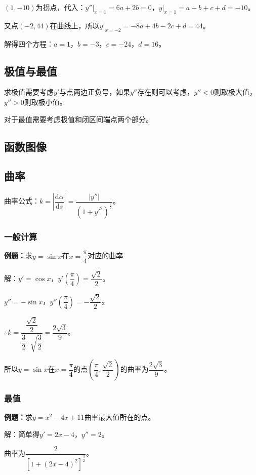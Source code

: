 \documentclass[UTF8, 12pt]{ctexart}
\begin{document}
$(1,-10)$为拐点，代入：$y''\vert_{x=1}=6a+2b=0$，$y\vert_{x=1}=a+b+c+d=-10$。

又点$(-2,44)$在曲线上，所以$y\vert_{x=-2}=-8a+4b-2c+d=44$。

解得四个方程：$a=1$，$b=-3$，$c=-24$，$d=16$。

\subsection{极值与最值}

求极值需要考虑$y'$与点两边正负号，如果$y''$存在则可以考虑，$y''<0$则取极大值，$y''>0$则取极小值。

对于最值需要考虑极值和闭区间端点两个部分。

\subsection{函数图像}

\subsection{曲率}

曲率公式：$k=\left\lvert\dfrac{\textrm{d}\alpha}{\textrm{d}s}\right\rvert=\dfrac{\vert y''\vert}{(1+y'^2)^{\frac{3}{2}}}$。

\subsubsection{一般计算}

\textbf{例题：}求$y=\sin x$在$x=\dfrac{\pi}{4}$对应的曲率

解：$y'=\cos x$，$y'(\dfrac{\pi}{4})=\dfrac{\sqrt{2}}{2}$。

$y''=-\sin x$，$y''(\dfrac{\pi}{4})=-\dfrac{\sqrt{2}}{2}$。

$\therefore k=\dfrac{\dfrac{\sqrt{2}}{2}}{\dfrac{3}{2}\cdot\sqrt{\dfrac{3}{2}}}=\dfrac{2\sqrt{3}}{9}$。

所以$y=\sin x$在$x=\dfrac{\pi}{4}$的点$(\dfrac{\pi}{4},\dfrac{\sqrt{2}}{2})$的曲率为$\dfrac{2\sqrt{3}}{9}$。

\subsubsection{最值}

\textbf{例题：}求$y=x^2-4x+11$曲率最大值所在的点。

解：简单得$y'=2x-4$，$y''=2$。

曲率为$\dfrac{2}{[1+(2x-4)^2]^{\frac{3}{2}}}$。
\end{document}
